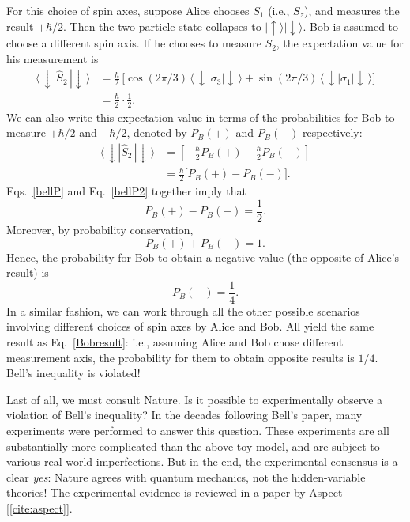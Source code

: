 \documentclass[pra,12pt]{revtex4-2}
\begin{document}
For this choice of spin axes, suppose Alice chooses $S_1$ (i.e.,
$S_z$), and measures the result $+\hbar/2$.  Then the two-particle
state collapses to $|\!\uparrow\rangle |\!\downarrow\rangle$.  Bob is
assumed to choose a different spin axis.  If he chooses to measure
$S_2$, the expectation value for his measurement is
\begin{align}
  \langle\,\downarrow | \hat{S}_2 \,|\!\downarrow\,\rangle
  &= \frac{\hbar}{2} \,
  \Big[\cos(2\pi/3) \, \langle\,\downarrow|\sigma_3| \downarrow\,\rangle
    + \sin(2\pi/3)\, \langle\,\downarrow|\sigma_1|\downarrow\,\rangle\Big]\\
  &= \frac{\hbar}{2} \cdot \frac{1}{2}.
  \label{bellP}
\end{align}
We can also write this expectation value in terms of the probabilities
for Bob to measure $+\hbar/2$ and $-\hbar/2$, denoted by $P_B(+)$ and
$P_B(-)$ respectively:
\begin{align}
  \langle\,\downarrow | \hat{S}_2 \,|\!\downarrow\,\rangle
  &= \left[+\frac{\hbar}{2} P_B(+) - \frac{\hbar}{2} P_B(-)\right] \\
  &= \frac{\hbar}{2} \Big[P_B(+) - P_B(-)\Big].
  \label{bellP2}
\end{align}
Eqs.~\eqref{bellP} and Eq.~\eqref{bellP2} together imply that
\begin{equation}
  P_B(+) - P_B(-) = \frac{1}{2}.
\end{equation}
Moreover, by probability conservation,
\begin{equation}
  P_B(+) + P_B(-) = 1.
\end{equation}
Hence, the probability for Bob to obtain a negative value (the
opposite of Alice's result) is
\begin{equation}
  P_B(-) = \frac{1}{4}.
  \label{Bobresult}
\end{equation}
In a similar fashion, we can work through all the other possible
scenarios involving different choices of spin axes by Alice and Bob.
All yield the same result as Eq.~\eqref{Bobresult}: i.e., assuming
Alice and Bob chose different measurement axis, the probability for
them to obtain opposite results is $1/4$.  Bell's inequality is
violated!

Last of all, we must consult Nature.  Is it possible to experimentally
observe a violation of Bell's inequality?  In the decades following
Bell's paper, many experiments were performed to answer this question.
These experiments are all substantially more complicated than the
above toy model, and are subject to various real-world imperfections.
But in the end, the experimental consensus is a clear \textit{yes}:
Nature agrees with quantum mechanics, not the hidden-variable
theories!  The experimental evidence is reviewed in a paper by Aspect
[\ref{cite:aspect}].
\end{document}
